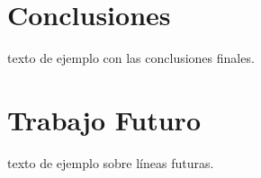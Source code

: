 \section{Conclusiones}
texto de ejemplo con las conclusiones finales.

\section{Trabajo Futuro}
texto de ejemplo sobre líneas futuras.